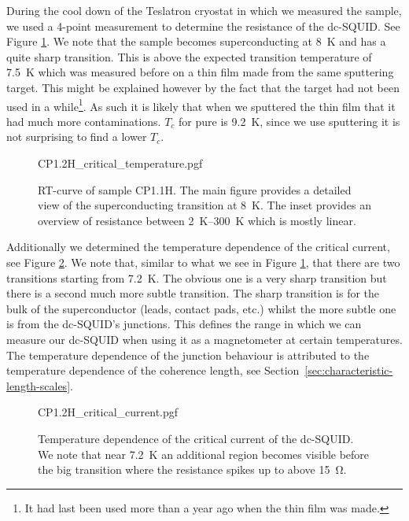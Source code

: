 During the cool down of the Teslatron cryostat in which we measured the sample, we used a 4-point measurement to determine the resistance of the dc-SQUID. See Figure \ref{fig:CP1.1H-SQUID-RT}. We note that the sample becomes superconducting at \qty{8}{\kelvin} and has a quite sharp transition. This is above the expected transition temperature of \qty{7.5}{\kelvin} which was measured before on a thin film made from the same sputtering target. This might be explained however by the fact that the  target had not been used in a while\footnote{It had last been used more than a year ago when the thin film was made.}. As such it is likely that when we sputtered the thin film that it had much more contaminations. $T_c$ for pure  is \qty{9.2}{\kelvin}\cite{maxfieldSuperconductingPenetrationDepth1965}, since we use sputtering it is not surprising to find a lower $T_c$.

\begin{figure}[ht]
	\centering
	{CP1.2H_critical_temperature.pgf}
	\caption{
		RT-curve of sample CP1.1H. The main figure provides a detailed view of the superconducting transition at \qty{8}{\kelvin}. The inset provides an overview of resistance between \qtyrange{2}{300}{\kelvin} which is mostly linear.
	}
	\label{fig:CP1.1H-SQUID-RT}
\end{figure}

Additionally we determined the temperature dependence of the critical current, see Figure \ref{fig:CP1.1H-SQUID-critical-current-temperature-dependence}. We note that, similar to what we see in Figure \ref{fig:CP1.1H-SQUID-RT}, that there are two transitions starting from \qty{7.2}{\kelvin}. The obvious one is a very sharp transition but there is a second much more subtle transition. The sharp transition is for the bulk of the superconductor (leads, contact pads, etc.) whilst the more subtle one is from the dc-SQUID's junctions. This defines the range in which we can measure our dc-SQUID when using it as a magnetometer at certain temperatures. The temperature dependence of the junction behaviour is attributed to the temperature dependence of the coherence length, see Section~\ref{sec:characteristic-length-scales}.

\begin{figure}[ht]
	\centering
	{CP1.2H_critical_current.pgf}
	\caption{Temperature dependence of the critical current of the dc-SQUID. We note that near \qty{7.2}{\kelvin} an additional region becomes visible before the big transition where the resistance spikes up to above \qty{15}{\ohm}.}
	\label{fig:CP1.1H-SQUID-critical-current-temperature-dependence}
\end{figure}

